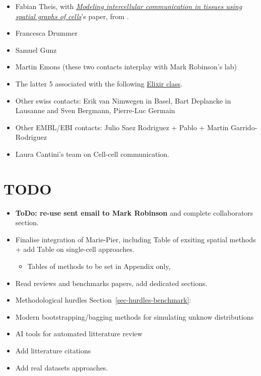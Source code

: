 \documentclass[
  letterpaper,
]{book}
\providecommand{\tightlist}{%
  \setlength{\itemsep}{0pt}\setlength{\parskip}{0pt}}\usepackage{longtable,booktabs,array}
\begin{document}
\begin{itemize}
\item
  Fabian Theis, with
  \href{https://www.nature.com/articles/s41587-022-01467-z}{\emph{Modeling
  intercellular communication in tissues using spatial graphs of
  cells}}'s paper, from \textcite{fischer2023nb}.
\item
  Francesca Drummer
\item
  Samuel Gunz
\item
  Martin Emons (these two contacts interplay with Mark Robinson's lab)
\item
  The latter 5 associated with the following
  \href{https://elixir-europe-training.github.io/ELIXIR-SCO-spatial-omics/schedule.html}{Elixir
  class}.
\item
  Other swiss contacts: Erik van Nimwegen in Basel, Bart Deplancke in
  Lausanne and Sven Bergmann, Pierre-Luc Germain
\item
  Other EMBL/EBI contacts: Julio Saez Rodriguez + Pablo + Martin
  Garrido-Rodriguez
\item
  Laura Cantini's team on Cell-cell communication.
\end{itemize}

\section{TODO}\label{todo}

\begin{itemize}
\tightlist
\item
  \textbf{ToDo: re-use sent email to Mark Robinson} and complete
  collaborators section.
\item
  Finalise integration of Marie-Pier, including Table of exsiting
  spatial methods + add Table on single-cell approaches.

  \begin{itemize}
  \tightlist
  \item
    Tables of methods to be set in Appendix only,
  \end{itemize}
\item
  Read reviews and benchmarks papers, add dedicated sections.
\item
  Methodological hurdles Section~\ref{sec-hurdles-benchmark}:
\item
  Modern bootstrapping/bagging methods for simulating unknow
  distributions
\item
  AI tools for automated litterature review
\item
  Add litterature citations
\item
  Add real datasets approaches.
\end{itemize}
\end{document}
